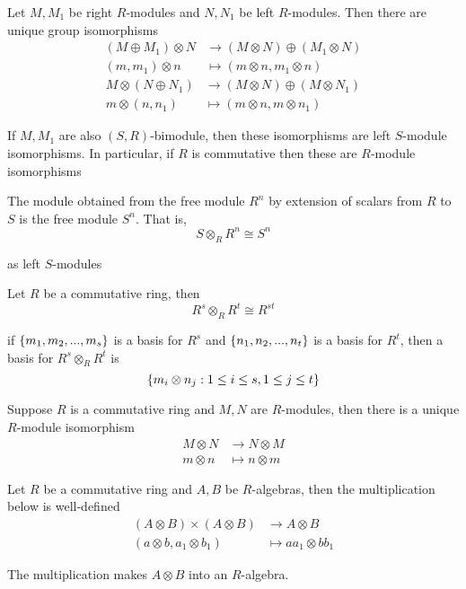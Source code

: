 \begin{theorem}
	Let $M, M_1$ be right $R$-modules and $N, N_1$ be left $R$-modules. Then there are unique group isomorphisms
	\begin{align*}
		(M \oplus M_1) \otimes N &\to (M \otimes N) \oplus (M_1 \otimes N) \\
		(m, m_1) \otimes n &\mapsto (m \otimes n, m_1 \otimes n)
	\end{align*}
	\begin{align*}
		M \otimes (N \oplus N_1) &\to (M \otimes N) \oplus (M \otimes N_1) \\
		m \otimes (n, n_1) &\mapsto (m \otimes n, m \otimes n_1)
	\end{align*}

	If $M, M_1$ are also $(S, R)$-bimodule, then these isomorphisms are left $S$-module isomorphisms. In particular, if $R$ is commutative then these are $R$-module isomorphisms
\end{theorem}

\begin{corollary}
	The module obtained from the free module $R^n$ by extension of scalars from $R$ to $S$ is the free module $S^n$. That is,
	$$
		S \otimes_R R^n \cong S^n
	$$
	
	as left $S$-modules
\end{corollary}

\begin{corollary}
	Let $R$ be a commutative ring, then 
	$$
		R^s \otimes_R R^t \cong R^{st}
	$$
	
	if $\{m_1, m_2, ..., m_s\}$ is a basis for $R^s$ and $\{n_1, n_2, ..., n_t\}$ is a basis for $R^t$, then a basis for $R^s \otimes_R R^t$ is
	$$
		\{m_i \otimes n_j: 1 \leq i \leq s, 1 \leq j \leq t\}
	$$
\end{corollary}

\begin{proposition}
	Suppose $R$ is a commutative ring and $M, N$ are $R$-modules, then there is a unique $R$-module isomorphism
	\begin{align*}
		M \otimes N &\to N \otimes M \\
		m \otimes n &\mapsto n \otimes m
	\end{align*}
\end{proposition}

\begin{proposition}
	Let $R$ be a commutative ring and $A, B$ be $R$-algebras, then the multiplication below is well-defined
	\begin{align*}
		(A \otimes B) \times (A \otimes B) &\to A \otimes B \\
		(a \otimes b, a_1 \otimes b_1) &\mapsto a a_1 \otimes b b_1
	\end{align*}
	
	The multiplication makes $A \otimes B$ into an $R$-algebra.
\end{proposition}

